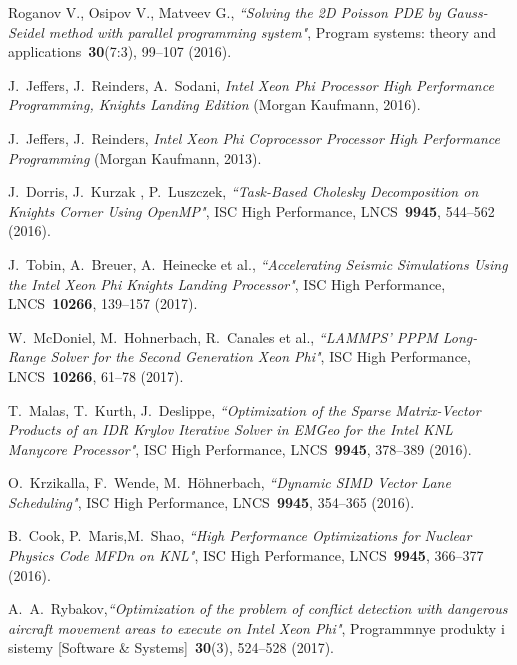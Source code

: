 \documentclass[
11pt,%
tightenlines,%
twoside,%
onecolumn,%
nofloats,%
nobibnotes,%
nofootinbib,%
superscriptaddress,%
noshowpacs,%
centertags]%
{revtex4}
\begin{document}
\begin{thebibliography}{99}
Roganov V., Osipov V., Matveev G., {\it ``Solving the 2D Poisson PDE by Gauss-Seidel method with parallel programming system"}, Program systems: theory and applications~{\bf 30}(7:3), 99--107 (2016).


J.~Jeffers, J.~Reinders, A.~Sodani, \emph{Intel Xeon Phi Processor High Performance Programming, Knights Landing Edition} (Morgan Kaufmann, 2016).

J.~Jeffers, J.~Reinders, \emph{Intel Xeon Phi Coprocessor Processor High Performance Programming} (Morgan Kaufmann, 2013).

J.~Dorris, J.~Kurzak , P.~Luszczek, {\it ``Task-Based Cholesky Decomposition on Knights Corner Using OpenMP"}, ISC High Performance, LNCS~{\bf 9945}, 544--562 (2016).

J.~Tobin, A.~Breuer, A.~Heinecke et al., {\it ``Accelerating Seismic Simulations Using the Intel Xeon Phi Knights Landing Processor"}, ISC High Performance, LNCS~{\bf 10266}, 139--157 (2017).

W.~McDoniel, M.~Hohnerbach, R.~Canales et al., {\it ``LAMMPS' PPPM Long-Range Solver for the Second Generation Xeon Phi"}, ISC High Performance, LNCS~{\bf 10266}, 61--78 (2017).

T.~Malas, T.~Kurth, J.~Deslippe, {\it ``Optimization of the Sparse Matrix-Vector Products of an IDR Krylov Iterative Solver in EMGeo for the Intel KNL Manycore Processor"}, ISC High Performance, LNCS~{\bf 9945}, 378--389 (2016).

O.~Krzikalla, F.~Wende, M.~H\"ohnerbach, {\it ``Dynamic SIMD Vector Lane Scheduling"}, ISC High Performance, LNCS~{\bf 9945}, 354--365 (2016).

B.~Cook, P.~Maris,M.~Shao, {\it ``High Performance Optimizations for Nuclear Physics Code MFDn on KNL"}, ISC High Performance, LNCS~{\bf 9945}, 366--377 (2016).

A.~A.~Rybakov,{\it ``Optimization of the problem of conflict detection with dangerous aircraft movement areas to execute on Intel Xeon Phi"}, Programmnye produkty i sistemy [Software \& Systems]~{\bf 30}(3), 524--528 (2017).


\end{thebibliography}
\end{document}

